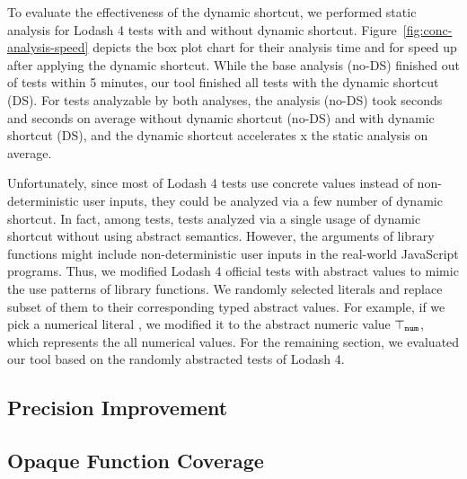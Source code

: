 To evaluate the effectiveness of the dynamic shortcut, we performed static
analysis for  Lodash 4 tests with and without dynamic shortcut.
Figure~\ref{fig:conc-analysis-speed} depicts the box plot chart for their
analysis time and for speed up after applying the dynamic shortcut.  While the
base analysis (no-DS) finished  out of  tests within 5
minutes, our tool finished all tests with the dynamic shortcut (DS).  For
 tests analyzable by both analyses, the analysis (no-DS) took
 seconds and  seconds on average without dynamic
shortcut (no-DS) and with dynamic shortcut (DS), and the dynamic shortcut
accelerates \textsf{x} the static analysis on average.

Unfortunately, since most of Lodash 4 tests use concrete values instead of
non-deterministic user inputs, they could be analyzed via a few number of
dynamic shortcut.  In fact, among  tests,  tests analyzed
via a single usage of dynamic shortcut without using abstract semantics.
However, the arguments of library functions might include non-deterministic user
inputs in the real-world JavaScript programs.  Thus, we modified Lodash 4
official tests with abstract values to mimic the use patterns of library
functions.  We randomly selected literals and replace subset of them to their
corresponding typed abstract values.  For example, if we pick a numerical
literal , we modified it to the abstract numeric value
$\top_{\texttt{num}}$, which represents the all numerical values.  For the
remaining section, we evaluated our tool based on the randomly abstracted tests
of Lodash 4.


\subsection{Precision Improvement}


\subsection{Opaque Function Coverage}
